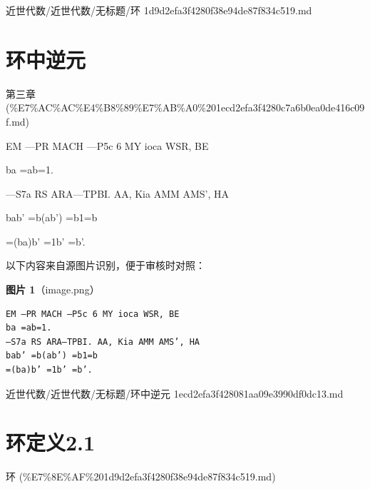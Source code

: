 \begin{note}[来源路径]

近世代数/近世代数/无标题/环 1d9d2efa3f4280f38e94de87f834c519.md

\end{note}

\section*{环中逆元}

\begin{note}[来源上级主题]

第三章 (\%E7\%AC\%AC\%E4\%B8\%89\%E7\%AB\%A0\%201ecd2efa3f4280c7a6b0ea0de416c09f.md)

\end{note}

\begin{note}[环中逆元]

EM —PR MACH —P5c 6 MY ioca WSR, BE

ba =ab=1.

—S7a RS ARA—TPBI. AA, Kia AMM AMS’, HA

bab’ =b(ab’) =b1=b

=(ba)b’ =1b’ =b’.

\end{note}

\begin{note}
以下内容来自源图片识别，便于审核时对照：

\textbf{图片 1}（image.png）
\begin{Verbatim}[fontsize=\small]
EM —PR MACH —P5c 6 MY ioca WSR, BE
ba =ab=1.
—S7a RS ARA—TPBI. AA, Kia AMM AMS’, HA
bab’ =b(ab’) =b1=b
=(ba)b’ =1b’ =b’.
\end{Verbatim}

\end{note}

\begin{note}[来源路径]

近世代数/近世代数/无标题/环中逆元 1ecd2efa3f428081aa09e3990df0dc13.md

\end{note}

\section*{环定义2.1}

\begin{note}[来源上级主题]

环 (\%E7\%8E\%AF\%201d9d2efa3f4280f38e94de87f834c519.md)

\end{note}

